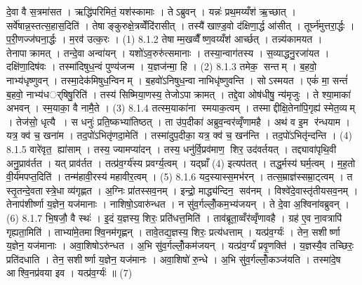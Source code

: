 दे॒वा वै स॒त्रमा॑सत । ऋद्धि॑परिमितं॒ यश॑स्कामाः । तेऽब्रुवन् । यन्नः॑ प्रथ॒मय्यँश॑ ऋ॒च्छात् । सर्वे॑षान्न॒स्तत्स॒हास॒दिति॑ । तेषाङ्कुरुक्षे॒त्रव्वेँदि॑रासीत् । तस्यै॑ खाण़्ड॒वो द॑क्षिणा॒र्द्ध आ॑सीत् । तूर्घ्न॑मुत्तरा॒र्द्धः । प॒री॒णज्ज॑घना॒र्द्धः । म॒रव॑ उत्क॒रः । (1)
8.1.2
तेषाम्म॒खव्वैँष्ण॒वय्यँश॑ आर्च्छत् । तन्न्य॑कामयत । तेनापाक्रामत् । तन्दे॒वा अन्वा॑यन् । यशो॑ऽव॒रुरु॑त्समानाः । तस्या॒न्वाग॑तस्य । स॒व्याद्धनु॒रजा॑यत । दक्षि॑णा॒दिष॑वः । तस्मा॑दिषुध॒न्वं पुण्य॑जन्म । य॒ज्ञज॑न्मा॒ हि । (2)
8.1.3
तमेक॒ सन्तम् । ब॒हवो॒ नाभ्य॑धृष्णुवन् । तस्मा॒देक॑मिषुध॒न्विनम् । ब॒हवो॑ऽनिषुध॒न्वा नाभिधृ॑ष्णुवन्ति । सोऽस्मयत । एकं॑ मा॒ सन्तं॑ ब॒हवो॒ नाभ्य॑धर््षिषु॒रिति॑ । तस्य॑ सिष्मिया॒णस्य॒ तेजोऽपाक्रामत् । तद्दे॒वा ओष॑धीषु॒ न्य॑मृजुः । ते श्या॒माका॑ अभवन् । स्म॒याका॒ वै नामै॒ते । (3)
8.1.4
तत्स्म॒याका॑ना स्मयाक॒त्वम् । तस्माद्दीक्षि॒तेना॑पि॒गृह्य॑ स्मेत॒व्यम् । तेज॑सो॒ धृत्यै । स धनुः॑ प्रति॒ष्कभ्या॑तिष्ठत् । ता उ॑प॒दीका॑ अब्रुव॒न्वर॑व्वृँणामहै । अथ॑ व इ॒म र॑न्धयाम । यत्र॒ क्व॑ च॒ खना॑म । तद॒पो॑ऽभितृ॑णदा॒मेति॑ । तस्मा॑दुप॒दीका॒ यत्र॒ क्व॑ च॒ खन॑न्ति । तद॒पो॑ऽभितृ॑न्दन्ति । (4)
8.1.5
वारे॑वृत॒ ह्या॑साम् । तस्य॒ ज्यामप्या॑दन् । तस्य॒ धनु॑र्वि॒प्रव॑माण॒ शिर॒ उद॑वर्तयत् । तद्द्यावा॑पृथि॒वी अनु॒प्राव॑र्तत । यत् प्राव॑र्तत । तत्प्र॑व॒र्ग्य॑स्य प्रवर्ग्य॒त्वम् । यद्घ्राँ (4) इत्यप॑तत् । तद्ध॒र्मस्य॑ घर्म॒त्वम् । म॒ह॒तो वी॒र्य॑मपप्त॒दिति॑ । तन्म॑हावी॒रस्य॑ महावीर॒त्वम् । (5)
8.1.6
यद॒स्यास्स॒मभ॑रन् । तत्स॒म्राज्ञ॑स्सम्रा॒ट्त्वम् । त स्तृ॒तन्दे॒वतास्त्रे॒धा व्य॑गृह्णत । अ॒ग्निः प्रा॑तस्सव॒नम् । इन्द्रो॒ माद्ध्य॑न्दिन॒ सव॑नम् । विश्वे॑दे॒वास्तृ॑तीयसव॒नम् । तेनाप॑शीर्ष्णा य॒ज्ञेन॒ यज॑मानाः । नाशिषो॒ऽवारु॑न्धत । न सु॑व॒र्गल्लोँ॒कम॒भ्य॑जयन् । ते दे॒वा अ॒श्विना॑वब्रुवन् । (6)
8.1.7
भि॒षजौ॒ वै स्थः॑ । इ॒दं य॒ज्ञस्य॒ शिरः॒ प्रति॑धत्त॒मिति॑ । ताव॑ब्रूता॒व्वँर॑व्वृँणावहै । ग्रह॑ ए॒व ना॒वत्रापि॑ गृह्यता॒मिति॑ । ताभ्या॑मे॒तमाश्वि॒नम॑गृह्णन् । तावे॒तद्य॒ज्ञस्य॒ शिरः॒ प्रत्य॑धत्ताम् । यत्प्र॑व॒र्ग्यः॑ । तेन॒ सशीर्ष्णा य॒ज्ञेन॒ यज॑मानाः । अवा॒शिषोऽरु॑न्धत । अ॒भि सु॑व॒र्गल्लोँ॒कम॑जयन् । यत्प्र॑व॒र्ग्यं॑ प्रवृ॒णक्ति॑ । य॒ज्ञस्यै॒व तच्छिरः॒ प्रति॑दधाति । तेन॒ सशीर्ष्णा य॒ज्ञेन॒ यज॑मानः । अवा॒शिषो॑ रु॒न्धे । अ॒भि सु॑व॒र्गल्लोँ॒कञ्ज॑यति । तस्मा॑दे॒ष आश्वि॒नप्र॑वया इव । यत्प्र॑व॒र्ग्यः॑ ॥ (7)
\anuvakamend


